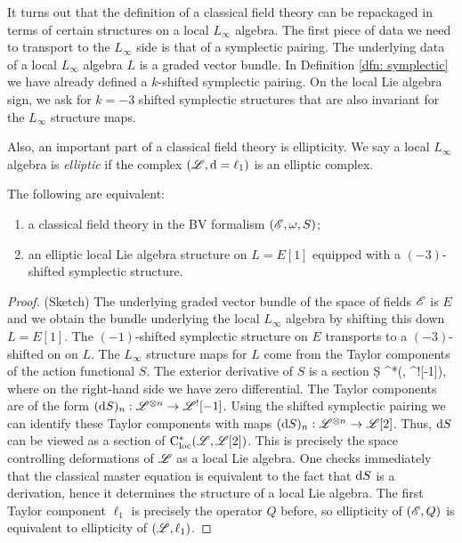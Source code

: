 It turns out that the definition of a classical field theory can be repackaged in terms of certain structures on a local $L_\infty$ algebra.
The first piece of data we need to transport to the $L_\infty$ side is that of a symplectic pairing. 
The underlying data of a local $L_\infty$ algebra $L$ is a graded vector bundle. 
In Definition \ref{dfn: symplectic} we have already defined a $k$-shifted symplectic pairing. 
On the local Lie algebra sign, we ask for $k=-3$ shifted symplectic structures that are also invariant for the $L_\infty$ structure maps. 

Also, an important part of a classical field theory is ellipticity. 
We say a local $L_\infty$ algebra is {\em elliptic} if the complex $(\mathscr L, {\rm d} = \ell_1)$ is an elliptic complex.

\begin{prop}
The following are equivalent:
\begin{enumerate}
\item a classical field theory in the BV formalism $(\mathscr E, \omega, S)$;
\item an elliptic local Lie algebra structure on $L = E [1]$ equipped with a $(-3)$-shifted symplectic structure.
\end{enumerate}
\end{prop}

\begin{proof} (Sketch) 
The underlying graded vector bundle of the space of fields $\mathscr E$ is $E$ and we obtain the bundle underlying the local $L_\infty$ algebra by shifting this down $L = E[1]$. 
The $(-1)$-shifted symplectic structure on $E$ transports to a $(-3)$-shifted on on $L$. 
The $L_\infty$ structure maps for $L$ come from the Taylor components of the action functional $S$. 
The exterior derivative of $S$ is a section
\ben
\d S \in \cloc^*(\sL, \sL^![-1]),
\een
where on the right-hand side we have zero differential.
The Taylor components are of the form $({\rm d} S)_n : \mathscr L^{\otimes n} \to \mathscr L^![-1]$. 
Using the shifted symplectic pairing we can identify these Taylor components with maps $({\rm d} S)_n : \mathscr L^{\otimes n} \to \mathscr L[2]$. 
Thus, ${\rm d} S$ can be viewed as a section of ${\rm C}_{\rm loc}^*(\mathscr L, \mathscr L[2])$. 
This is precisely the space controlling deformations of $\mathscr L$ as a local Lie algebra.
One checks immediately that the classical master equation is equivalent to the fact that ${\rm d} S$ is a derivation, hence it determines the structure of a local Lie algebra. 
The first Taylor component $\ell_1$ is precisely the operator $Q$ before, so ellipticity of $(\mathscr E, Q)$ is equivalent to ellipticity of $(\mathscr L, \ell_1)$. 
\end{proof}


